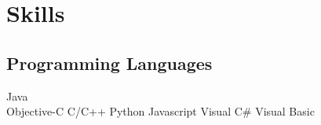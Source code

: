 \documentclass[]{deedy-resume-openfont}
\begin{document}
\begin{minipage}[t]{0.33\textwidth}




\section{Skills}
\subsection{Programming Languages}
Java\\  %
\vspace{1mm}
Objective-C \textbullet{} C/C++ \textbullet{} Python \textbullet{} Javascript \textbullet{} Visual C\# \textbullet{}Visual Basic
\sectionsep


\end{minipage}
\end{document}
